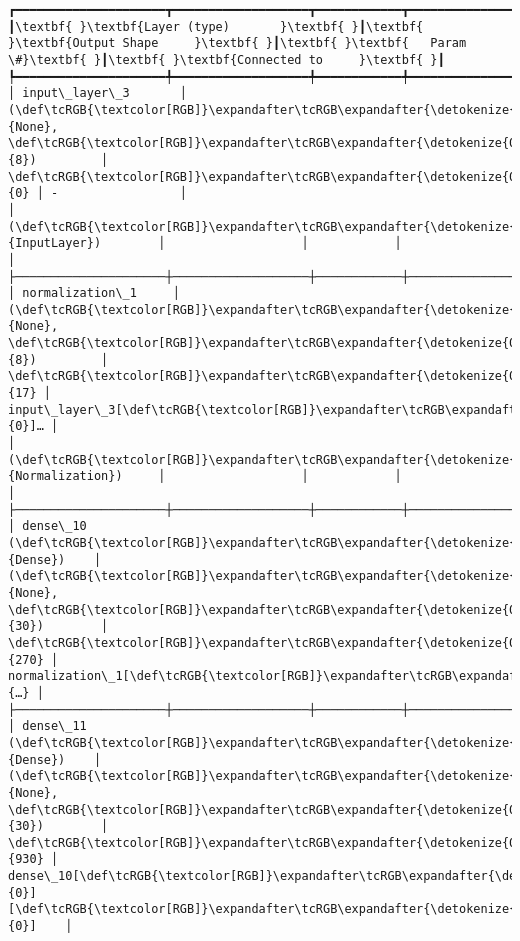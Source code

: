 \documentclass[12pt letter]{report}
\begin{document}
    
    
    \begin{Verbatim}[commandchars=\\\{\}]
┏━━━━━━━━━━━━━━━━━━━━━┳━━━━━━━━━━━━━━━━━━━┳━━━━━━━━━━━━┳━━━━━━━━━━━━━━━━━━━┓
┃\textbf{ }\textbf{Layer (type)       }\textbf{ }┃\textbf{ }\textbf{Output Shape     }\textbf{ }┃\textbf{ }\textbf{   Param \#}\textbf{ }┃\textbf{ }\textbf{Connected to     }\textbf{ }┃
┡━━━━━━━━━━━━━━━━━━━━━╇━━━━━━━━━━━━━━━━━━━╇━━━━━━━━━━━━╇━━━━━━━━━━━━━━━━━━━┩
│ input\_layer\_3       │ (\def\tcRGB{\textcolor[RGB]}\expandafter\tcRGB\expandafter{\detokenize{0,215,255}}{None}, \def\tcRGB{\textcolor[RGB]}\expandafter\tcRGB\expandafter{\detokenize{0,175,0}}{8})         │          \def\tcRGB{\textcolor[RGB]}\expandafter\tcRGB\expandafter{\detokenize{0,175,0}}{0} │ -                 │
│ (\def\tcRGB{\textcolor[RGB]}\expandafter\tcRGB\expandafter{\detokenize{0,135,255}}{InputLayer})        │                   │            │                   │
├─────────────────────┼───────────────────┼────────────┼───────────────────┤
│ normalization\_1     │ (\def\tcRGB{\textcolor[RGB]}\expandafter\tcRGB\expandafter{\detokenize{0,215,255}}{None}, \def\tcRGB{\textcolor[RGB]}\expandafter\tcRGB\expandafter{\detokenize{0,175,0}}{8})         │         \def\tcRGB{\textcolor[RGB]}\expandafter\tcRGB\expandafter{\detokenize{0,175,0}}{17} │ input\_layer\_3[\def\tcRGB{\textcolor[RGB]}\expandafter\tcRGB\expandafter{\detokenize{0,175,0}}{0}]… │
│ (\def\tcRGB{\textcolor[RGB]}\expandafter\tcRGB\expandafter{\detokenize{0,135,255}}{Normalization})     │                   │            │                   │
├─────────────────────┼───────────────────┼────────────┼───────────────────┤
│ dense\_10 (\def\tcRGB{\textcolor[RGB]}\expandafter\tcRGB\expandafter{\detokenize{0,135,255}}{Dense})    │ (\def\tcRGB{\textcolor[RGB]}\expandafter\tcRGB\expandafter{\detokenize{0,215,255}}{None}, \def\tcRGB{\textcolor[RGB]}\expandafter\tcRGB\expandafter{\detokenize{0,175,0}}{30})        │        \def\tcRGB{\textcolor[RGB]}\expandafter\tcRGB\expandafter{\detokenize{0,175,0}}{270} │ normalization\_1[\def\tcRGB{\textcolor[RGB]}\expandafter\tcRGB\expandafter{\detokenize{0,175,0}}{…} │
├─────────────────────┼───────────────────┼────────────┼───────────────────┤
│ dense\_11 (\def\tcRGB{\textcolor[RGB]}\expandafter\tcRGB\expandafter{\detokenize{0,135,255}}{Dense})    │ (\def\tcRGB{\textcolor[RGB]}\expandafter\tcRGB\expandafter{\detokenize{0,215,255}}{None}, \def\tcRGB{\textcolor[RGB]}\expandafter\tcRGB\expandafter{\detokenize{0,175,0}}{30})        │        \def\tcRGB{\textcolor[RGB]}\expandafter\tcRGB\expandafter{\detokenize{0,175,0}}{930} │ dense\_10[\def\tcRGB{\textcolor[RGB]}\expandafter\tcRGB\expandafter{\detokenize{0,175,0}}{0}][\def\tcRGB{\textcolor[RGB]}\expandafter\tcRGB\expandafter{\detokenize{0,175,0}}{0}]    │

\end{Verbatim}
\end{document}
